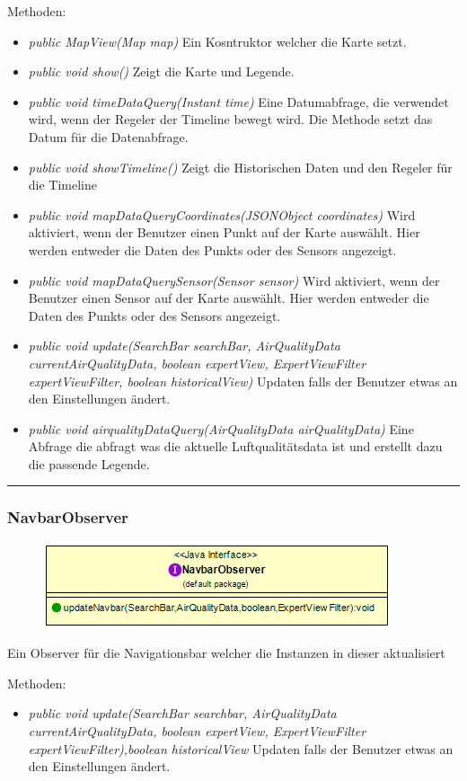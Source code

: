 Methoden: \begin{itemize} [noitemsep]
    \item \emph{public MapView(Map map)} Ein Kosntruktor welcher die Karte setzt.
    \item \emph{public void show()} Zeigt die Karte und Legende.
    \item \emph{public void timeDataQuery(Instant time)} Eine Datumabfrage, die verwendet wird, wenn der Regeler der Timeline bewegt wird. Die Methode setzt das Datum für die Datenabfrage.
    \item \emph{public void showTimeline()} Zeigt die Historischen Daten und den Regeler für die Timeline
    \item \emph{public void mapDataQueryCoordinates(JSONObject coordinates)} Wird aktiviert, wenn der Benutzer einen Punkt auf der Karte auswählt. Hier werden entweder die Daten des Punkts oder des Sensors angezeigt.
    \item \emph{public void mapDataQuerySensor(Sensor sensor)} Wird aktiviert, wenn der Benutzer einen Sensor auf der Karte auswählt. Hier werden entweder die Daten des Punkts oder des Sensors angezeigt.
    \item \emph{public void update(SearchBar searchBar, AirQualityData currentAirQualityData,
    boolean expertView, ExpertViewFilter expertViewFilter, boolean historicalView)} Updaten falls der Benutzer etwas an den Einstellungen ändert.
    \item \emph{public void airqualityDataQuery(AirQualityData airQualityData)} Eine Abfrage die abfragt was die aktuelle Luftqualitätsdata ist und erstellt dazu die passende Legende. 
\end{itemize} 

\rule{\textwidth}{0.4pt}
\subsubsection{NavbarObserver}
\begin{minipage}{0.4\textwidth}
    \begin{figure}[H]
        {\centering\includegraphics[scale = 0.5
        ]{media/view/view/NavbarObserver_Class.png}}
    \end{figure}
    \end{minipage} \hfill
    \begin{minipage}{0.5\textwidth}
Ein Observer für die Navigationsbar welcher die Instanzen in dieser aktualisiert
\end{minipage}
\vspace{\baselineskip}
Methoden: \begin{itemize} [noitemsep]
    \item \emph{public void update(SearchBar searchbar, AirQualityData currentAirQualityData,
    boolean expertView, ExpertViewFilter expertViewFilter),boolean historicalView} Updaten falls der Benutzer etwas an den Einstellungen ändert.
\end{itemize}

